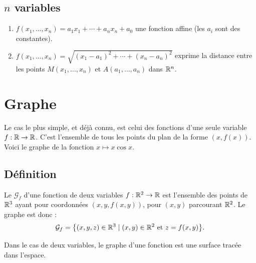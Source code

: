 \subsection{$n$ variables}

\begin{exemple}{}{}
	
	\begin{enumerate}
		\item $f(x_1,\ldots,x_n) = a_1x_1+\cdots+a_nx_n+a_0$ une fonction affine (les $a_i$ sont des constantes).
		\item $f(x_1,\ldots,x_n) = \sqrt{(x_1-a_1)^2+\cdots+(x_n-a_n)^2}$ exprime la distance entre les points $M(x_1,\ldots,x_n)$ et $A(a_1,\ldots,a_n)$ dans $\mathbb{R}^n$.
	\end{enumerate}
\end{exemple}


\section{Graphe}

Le cas le plus simple, et déjà connu, est celui des fonctions d'une seule variable $f : \mathbb{R} \rightarrow \mathbb{R}$.  C'est l'ensemble de tous les points du plan de la forme $(x,f(x))$. Voici le graphe de la fonction $x \mapsto x\cos x$.




\subsection{Définition}





\begin{definition}{}{}
	Le  $\mathcal{G}_f$ d'une fonction de deux variables $f : \mathbb{R}^2 \to \mathbb{R}$ est  l'ensemble des points de $\mathbb{R}^3$ ayant pour coordonnées $(x,y,f(x,y))$, pour $(x,y)$ parcourant $\mathbb{R}^2$. Le graphe est donc :
	$$\mathcal{G}_f= \big\{ (x,y,z) \in \mathbb{R}^3 \mid (x,y)\in \mathbb{R}^2 \text{ et } z=f(x,y)\big\}.$$
\end{definition}

Dans le cas de deux variables, le graphe d'une fonction est une surface tracée dans l'espace.


